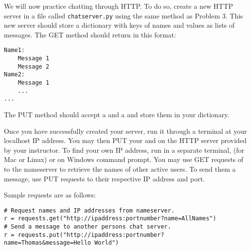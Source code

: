 \begin{problem}
We will now practice chatting through HTTP.
To do so, create a new HTTP server in a file called \texttt{chatserver.py} using the same method as Problem 3. %
This new server should store a dictionary with keys of names and values as lists of messages.
The GET method should return in this format:
\begin{lstlisting}
Name1:
	Message 1
	Message 2
Name2:
	Message 1
	...
...
\end{lstlisting}
The PUT method should accept a  and a  and store them in your dictionary.

Once you have successfully created your server, run it through a terminal at your localhost IP address.
You may then PUT your  and  on the HTTP server provided by your instructor.
To find your own IP address, run in a separate terminal,  (for Mac or Linux) or  on Windows command prompt.
You may use GET requests of  to the nameserver to retrieve the names of other active users.
To send them a message, use PUT requests to their respective IP address and port.

Sample requests are as follows:

\begin{lstlisting}
# Request names and IP addresses from nameserver.
r = requests.get("http://ipaddress:portnumber?name=AllNames")
# Send a message to another persons chat server.
r = requests.put("http://ipaddress:portnumber?name=Thomas&message=Hello World")
\end{lstlisting}


\begin{center}


\end{center}
\end{problem}
